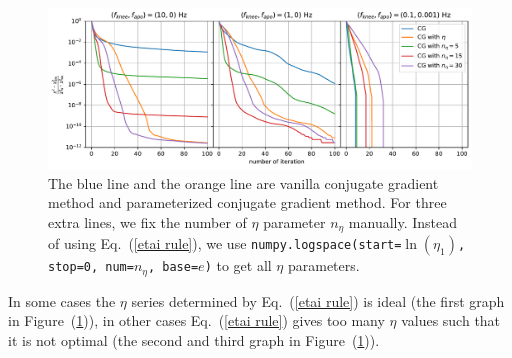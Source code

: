 \documentclass[twocolumn,linenumbers]{aastex631}
\newcommand{\kmh}[1]{\textcolor{red}{KMH: #1}}
\begin{document}
%

\begin{figure}[htb!]
\centering
\includegraphics[width=\textwidth]{chi2_neta.pdf}
\caption{The blue line and the orange line are 
vanilla conjugate gradient method and parameterized conjugate gradient method.
For three extra lines, we fix the number of $\eta$ parameter $n_{\eta}$ manually.
Instead of using Eq.~(\ref{etai rule}), we use
\texttt{numpy.logspace(start=$\ln(\eta_1)$, stop=0, num=$n_{\eta}$, base=$e$)}
to get all $\eta$ parameters.
}
\label{chi2 neta}
\end{figure}

In some cases the $\eta$ series determined by Eq.~(\ref{etai rule}) is ideal
(the first graph in Figure~(\ref{chi2 neta})), in other cases Eq.~(\ref{etai rule})
gives too many $\eta$ values such that it is not optimal (the second and third
graph in Figure~(\ref{chi2 neta})).



\end{document}
